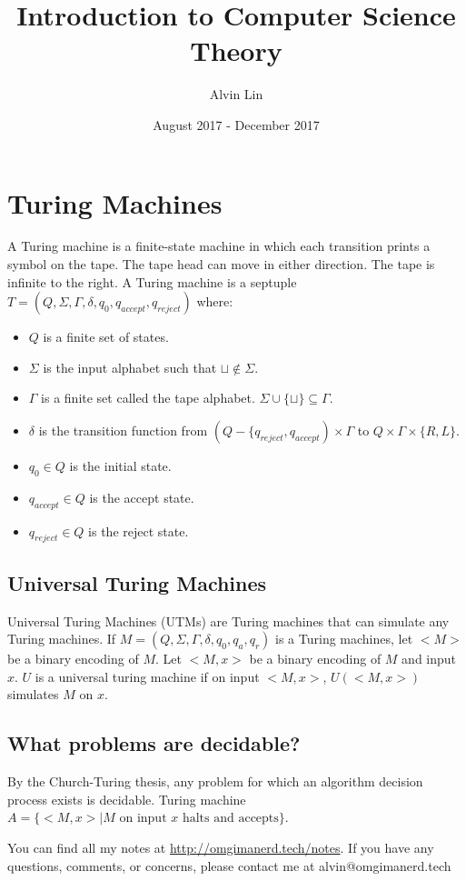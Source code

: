 \documentclass{math}
\title{Introduction to Computer Science Theory}
\author{Alvin Lin}
\date{August 2017 - December 2017}
\begin{document}
\maketitle

\section*{Turing Machines}
A Turing machine is a finite-state machine in which each transition prints a
symbol on the tape. The tape head can move in either direction. The tape is
infinite to the right. A Turing machine is a septuple \( T =
(Q,\Sigma,\Gamma,\delta,q_0,q_{accept},q_{reject}) \) where:
\begin{itemize}
  \item \( Q \) is a finite set of states.
  \item \( \Sigma \) is the input alphabet such that \( \sqcup\notin\Sigma \).
  \item \( \Gamma \) is a finite set called the tape alphabet.
  \( \Sigma\cup\{\sqcup\}\subseteq\Gamma \).
  \item \( \delta \) is the transition function from
    \( (Q-\{q_{reject},q_{accept})\times\Gamma \) to
    \( Q\times\Gamma\times\{R,L\} \).
  \item \( q_0\in Q \) is the initial state.
  \item \( q_{accept}\in Q \) is the accept state.
  \item \( q_{reject}\in Q \) is the reject state.
\end{itemize}

\subsection*{Universal Turing Machines}
Universal Turing Machines (UTMs) are Turing machines that can simulate any
Turing machines. If \( M = (Q,\Sigma,\Gamma,\delta,q_0,q_a,q_r) \) is a
Turing machines, let \( <M> \) be a binary encoding of \( M \). Let \( <M,x> \)
be a binary encoding of \( M \) and input \( x \). \( U \) is a universal turing
machine if on input \( <M,x> \), \( U(<M,x>) \) simulates \( M \) on \( x \).

\subsection*{What problems are decidable?}
By the Church-Turing thesis, any problem for which an algorithm decision process
exists is decidable. Turing machine \( A = \{<M,x>\mid M\text{ on input } x
\text{ halts and accepts}\} \).

\begin{center}
  You can find all my notes at \url{http://omgimanerd.tech/notes}. If you have
  any questions, comments, or concerns, please contact me at
  alvin@omgimanerd.tech
\end{center}
\end{document}
